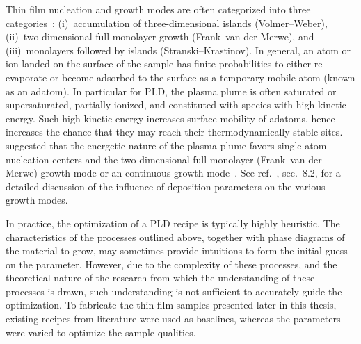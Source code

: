 Thin film nucleation and growth modes are often categorized into three categories~\cite{Greene1993}: (i)~accumulation of three-dimensional islands (Volmer--Weber), (ii)~two dimensional full-monolayer growth (Frank--van der Merwe), and (iii)~monolayers followed by islands (Stranski--Krastinov). In general, an atom or ion landed on the surface of the sample has finite probabilities to either re-evaporate or become adsorbed to the surface as a temporary mobile atom (known as an adatom). In particular for PLD, the plasma plume is often saturated or supersaturated, partially ionized, and constituted with species with high kinetic energy. Such high kinetic energy increases surface mobility of adatoms, hence increases the chance that they may reach their thermodynamically stable sites. \citeauthor{Metev1989} suggested that the energetic nature of the plasma plume favors single-atom nucleation centers and the two-dimensional full-monolayer (Frank--van der Merwe) growth mode or an continuous growth mode~\cite{Metev1989}. See ref.~\cite{PLD_book}, sec.~8.2, for a detailed discussion of the influence of deposition parameters on the various growth modes.

In practice, the optimization of a PLD recipe is typically highly heuristic. The characteristics of the processes outlined above, together with phase diagrams of the material to grow, may sometimes provide intuitions to form the initial guess on the parameter. However, due to the complexity of these processes, and the theoretical nature of the research from which the understanding of these processes is drawn, such understanding is not sufficient to accurately guide the optimization. To fabricate the thin film samples presented later in this thesis, existing recipes from literature were used as baselines, whereas the parameters were varied to optimize the sample qualities.